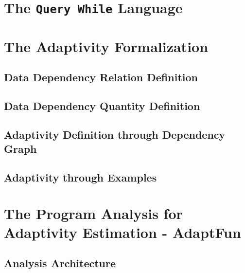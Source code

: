 \documentclass[12pt, letterpaper]{report}   %
\newcommand{\THESYSTEM}{\textsf{AdaptFun}}
\begin{document}
\section{The {\tt Query While} Language}
\label{sec:adapt-language}


\clearpage
\section{The Adaptivity Formalization}
\label{sec:adapt-exe}


\subsection{Data Dependency Relation Definition}
\label{sec:dynamic-datadep}


\subsection{Data Dependency Quantity Definition}
\label{sec:dynamic-reachability}
%

\subsection{Adaptivity Definition through Dependency Graph}
\label{sec:dynamic-adapt}
%
%
% 

\subsection{Adaptivity through Examples}
\label{sec:dynamic-examples}
%


\clearpage
\section{The Program Analysis for Adaptivity Estimation - {\THESYSTEM}}
\label{sec:adapt-static}


\subsection{Analysis Architecture}
\label{sec:static-overview}

\end{document}
